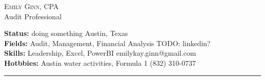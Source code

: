 \documentclass[10pt,A4]{article}
\newcommand{\cvsection}[1]
{
	\begin{center}
		\large\textcolor{sectcol}{\textbf{#1}}
	\end{center}
}
\newcommand{\metasection}[2]
{
\footnotesize{#2} \hspace*{\fill} \footnotesize{#1}\\[1pt]
}
\begin{document}
\pagestyle{fancy}	








\vspace{-8pt}
\begin{center}
	\HUGE \textsc{Emily Ginn, CPA} \textcolor{sectcol}\\
	\small Audit Professional
\end{center}



\vspace{6pt}


\metasection{Austin, Texas}{\textbf{Status:} doing something}
\metasection{TODO: linkedin?}{\textbf{Fields:} Audit, Management, Financial Analysis}
\metasection{emilykay.ginn@gmail.com}{\textbf{Skills:} Leadership, Excel, PowerBI}
\metasection{(832) 310-0737}{\textbf{Hotbbies:} Austin water activities, Formula 1}
\vspace{-2pt}
\textcolor{softcol}{\hrule}
\vspace{6pt}

\normalsize

\end{document}
